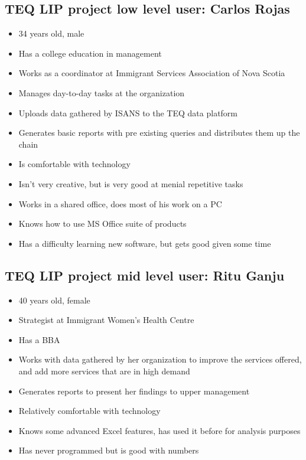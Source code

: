 \documentclass[]{scrartcl}
\begin{document}
\subsection{TEQ LIP project low level user: Carlos Rojas}
\begin{itemize}
	\item 34 years old, male
	\item Has a college education in management
	\item Works as a coordinator at Immigrant Services Association of Nova Scotia
	\item Manages day-to-day tasks at the organization
	\item Uploads data gathered by ISANS to the TEQ data platform
	\item Generates basic reports with pre existing queries and distributes them up the chain
	\item Is comfortable with technology
	\item Isn't very creative, but is very good at menial repetitive tasks
	\item Works in a shared office, does most of his work on a PC
	\item Knows how to use MS Office suite of products
	\item Has a difficulty learning new software, but gets good given some time
\end{itemize}

\subsection{TEQ LIP project mid level user: Ritu Ganju}
\begin{itemize}
	\item 40 years old, female
	\item Strategist at Immigrant Women’s Health Centre
	\item Has a BBA
	\item Works with data gathered by her organization to improve the services offered, and add more services that are in high demand
	\item Generates reports to present her findings to upper management
	\item Relatively comfortable with technology
	\item Knows some advanced Excel features, has used it before for analysis purposes
	\item Has never programmed but is good with numbers
\end{itemize}
\end{document}
